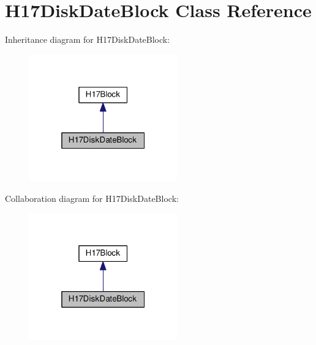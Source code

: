 \hypertarget{classH17DiskDateBlock}{}\section{H17\+Disk\+Date\+Block Class Reference}
\label{classH17DiskDateBlock}


Inheritance diagram for H17\+Disk\+Date\+Block\+:
\nopagebreak
\begin{figure}[H]
\begin{center}
\leavevmode
\includegraphics[width=181pt]{classH17DiskDateBlock__inherit__graph}
\end{center}
\end{figure}


Collaboration diagram for H17\+Disk\+Date\+Block\+:
\nopagebreak
\begin{figure}[H]
\begin{center}
\leavevmode
\includegraphics[width=181pt]{classH17DiskDateBlock__coll__graph}
\end{center}
\end{figure}
